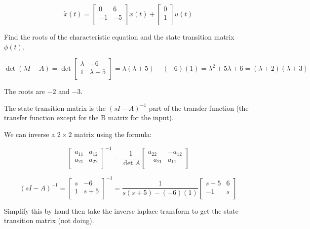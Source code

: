 \documentclass[11pt]{article}
\begin{document}
\[\dot x(t) = 
\begin{bmatrix}
    0 & 6 \\
    -1 & -5 \\
\end{bmatrix}
x(t) +
\begin{bmatrix}
    0 \\
    1 \\
\end{bmatrix}
u(t)
\]

Find the roots of the characteristic equation and the state transition matrix $\phi(t)$.

\[
    \det(\lambda I - A) = \det
    \begin{bmatrix}
        \lambda & -6 \\
        1 & \lambda + 5 \\
    \end{bmatrix}
    = \lambda (\lambda + 5) - (-6) (1) = \lambda^2 + 5 \lambda + 6 = (\lambda + 2) (\lambda + 3)
\]

The roots are $-2$ and $-3$.

The state transition matrix is the $(sI - A)^{-1}$ part of the transfer function (the transfer function except for the B matrix for the input).

We can inverse a $2 \times 2$ matrix using the formula:

\[  
    \begin{bmatrix}
        a_{11} & a_{12} \\
        a_{21} & a_{22} \\
    \end{bmatrix}^{-1}
    = \dfrac{1}{\det A} \begin{bmatrix}
        a_{22} & -a_{12} \\
        -a_{21} & a_{11} \\
    \end{bmatrix}
\]

\[
    (sI - A)^{-1} =
    \begin{bmatrix}
        s & -6 \\
        1 & s + 5 \\
    \end{bmatrix}^{-1}
    =
    \dfrac{1}{s(s + 5) - (-6)(1)}
    \begin{bmatrix}
        s + 5 & 6 \\
        -1 & s \\
    \end{bmatrix}
\]

Simplify this by hand then take the inverse laplace transform to get the state transition matrix (not doing).
\end{document}
